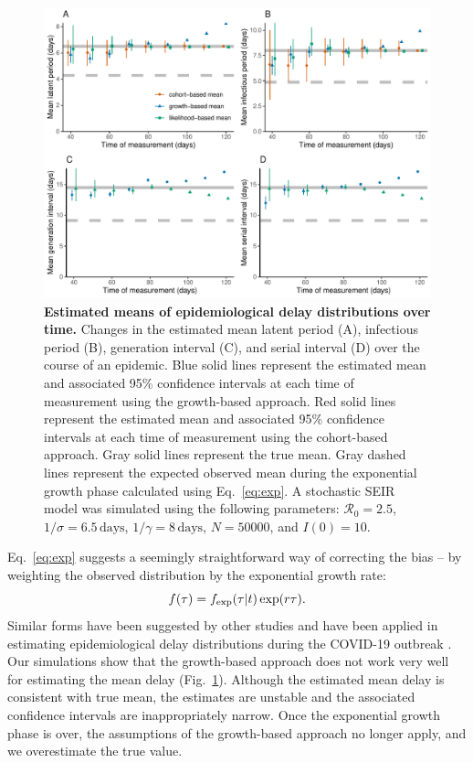 \documentclass[12pt]{article}
\newcommand{\eref}[1]{Eq.~\ref{eq:#1}}
\newcommand{\fref}[1]{Fig.~\ref{fig:#1}}
\begin{document}
\begin{figure}[!th]
\includegraphics[width=\textwidth]{figure_seir2.pdf}
\caption{
\textbf{Estimated means of epidemiological delay distributions over time.}
Changes in the estimated mean latent period (A), infectious period (B), generation interval (C), and serial interval (D) over the course of an epidemic.
Blue solid lines represent the estimated mean and associated 95\% confidence intervals at each time of measurement using the growth-based approach.
Red solid lines represent the estimated mean and associated 95\% confidence intervals at each time of measurement using the cohort-based approach.
Gray solid lines represent the true mean.
Gray dashed lines represent the expected observed mean during the exponential growth phase calculated using \eref{exp}.
A stochastic SEIR model was simulated using the following parameters: $\mathcal R_0 = 2.5$, $1/\sigma = 6.5\,\textrm{days}$, $1/\gamma = 8\,\textrm{days}$, $N=50000$, and $I(0)=10$.
}
\label{fig:seir2}
\end{figure}

\eref{exp} suggests a seemingly straightforward way of correcting the bias -- by weighting the observed distribution by the exponential growth rate:
\begin{equation}
f(\tau) = f_{\tiny\textrm{exp}}(\tau|t) \exp(r \tau).
\end{equation}
Similar forms have been suggested by other studies \citep{britton2019estimation, park2019inferring} and have been applied in estimating epidemiological delay distributions during the COVID-19 outbreak \citep{nishiura2020serial, linton2020incubation}.
Our simulations show that the growth-based approach does not work very well for estimating the mean delay (\fref{seir2}).
Although the estimated mean delay is consistent with true mean, the estimates are unstable and the associated confidence intervals are inappropriately narrow.
Once the exponential growth phase is over, the assumptions of the growth-based approach no longer apply, and we overestimate the true value.
\end{document}

